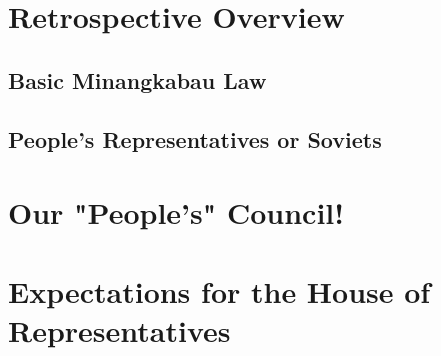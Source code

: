 \section{Retrospective Overview}

\subsection{Basic Minangkabau Law}

\subsection{People's Representatives or Soviets}

\section{Our "People's" Council!}

\section{Expectations for the House of Representatives}
